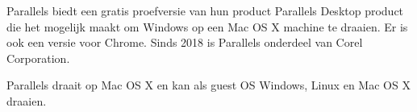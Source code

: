 Parallels biedt een gratis proefversie van hun product Parallels Desktop product die het mogelijk maakt om Windows op een Mac OS X machine te draaien. Er is ook een versie voor Chrome. Sinds 2018 is Parallels onderdeel van Corel Corporation.

Parallels draait op Mac OS X en kan als guest OS Windows, Linux en Mac OS X draaien.
